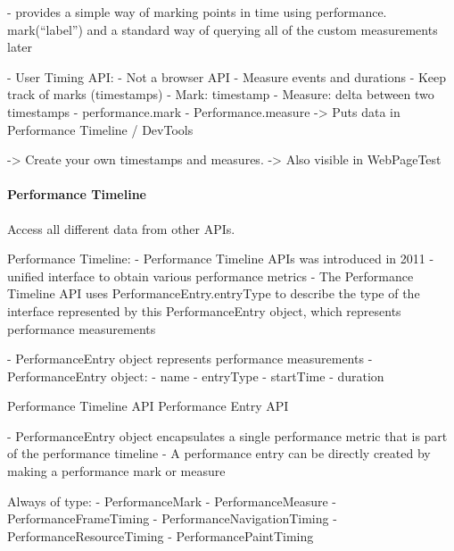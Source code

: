 

- provides a simple way of marking points in time using performance. mark(“label”) and a standard way of querying all of the custom measurements later


- User Timing API:
	- Not a browser API
	- Measure events and durations
	- Keep track of marks (timestamps)
	- Mark: timestamp
	- Measure: delta between two timestamps
	- performance.mark
	- Performance.measure
	-> Puts data in Performance Timeline / DevTools

	-> Create your own timestamps and measures.
	-> Also visible in WebPageTest





\paragraph{Performance Timeline}


Access all different data from other APIs.




Performance Timeline:
-  Performance Timeline APIs was introduced in 2011
- unified interface to obtain various performance metrics
- The Performance Timeline API uses PerformanceEntry.entryType to describe the type of the interface represented by this PerformanceEntry object, which represents performance measurements

- PerformanceEntry object represents performance measurements
- PerformanceEntry object:
	- name
	- entryType
	- startTime
	- duration
	
	
	
Performance Timeline API %
Performance Entry API %




- PerformanceEntry object encapsulates a single performance metric that is part of the performance timeline
- A performance entry can be directly created by making a performance mark or measure

Always of type:
- PerformanceMark
- PerformanceMeasure
- PerformanceFrameTiming
- PerformanceNavigationTiming
- PerformanceResourceTiming
- PerformancePaintTiming

